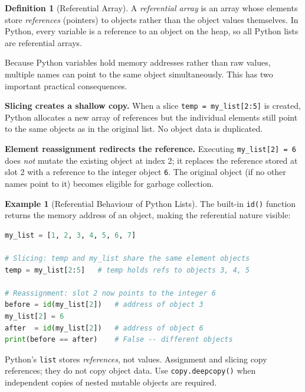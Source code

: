 \documentclass[11pt, a4paper, notitlepage]{report}
\theoremstyle{definition}
\newtheorem{definition}[theorem]{Definition}
\theoremstyle{remark}
\theoremstyle{definition}
\newtheorem{example}[theorem]{Example}
\begin{document}
\begin{definition}[Referential Array]
A \emph{referential array} is an array whose elements store \emph{references}
(pointers) to objects rather than the object values themselves. In Python,
every variable is a reference to an object on the heap, so all Python lists
are referential arrays.
\end{definition}

Because Python variables hold memory addresses rather than raw values, multiple
names can point to the same object simultaneously. This has two important
practical consequences.

\textbf{Slicing creates a shallow copy.} When a slice \texttt{temp = my\_list[2:5]}
is created, Python allocates a new array of references but the individual elements
still point to the same objects as in the original list. No object data is
duplicated.

\textbf{Element reassignment redirects the reference.} Executing
\texttt{my\_list[2] = 6} does \emph{not} mutate the existing object at index 2;
it replaces the reference stored at slot 2 with a reference to the integer object
\texttt{6}. The original object (if no other names point to it) becomes eligible
for garbage collection.

\begin{example}[Referential Behaviour of Python Lists]
The built-in \texttt{id()} function returns the memory address of an object,
making the referential nature visible:
\begin{lstlisting}[language=Python]
my_list = [1, 2, 3, 4, 5, 6, 7]

# Slicing: temp and my_list share the same element objects
temp = my_list[2:5]   # temp holds refs to objects 3, 4, 5

# Reassignment: slot 2 now points to the integer 6
before = id(my_list[2])   # address of object 3
my_list[2] = 6
after  = id(my_list[2])   # address of object 6
print(before == after)    # False -- different objects
\end{lstlisting}
\end{example}

\begin{keyresult}[title={Key Result: Python Lists Are Referential}]
Python's \texttt{list} stores \emph{references}, not values. Assignment and
slicing copy references; they do not copy object data. Use
\texttt{copy.deepcopy()} when independent copies of nested mutable objects
are required.
\end{keyresult}
\end{document}
